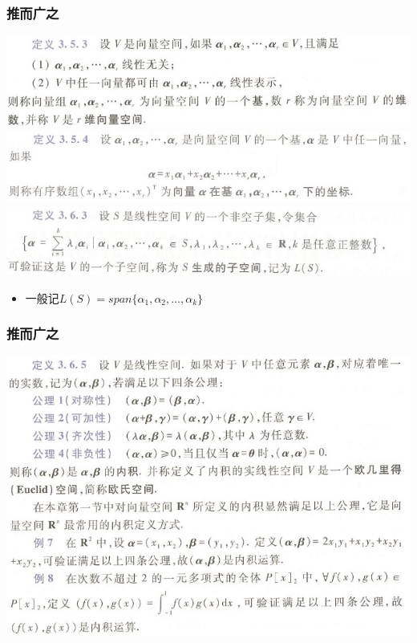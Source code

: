 \documentclass[CJKutf8,xcolor=pdftex,dvipsnames,table]{beamer}
\begin{document}
\begin{CJK*}{UTF8}{song}
  \begin{frame}
    \frametitle{推而广之}
    \begin{center}
      \includegraphics[scale=.5]{cqu-la-def-3-5-3}
      \includegraphics[scale=.5]{cqu-la-def-3-5-4}
      \includegraphics[scale=.5]{cqu-la-def-3-6-3}
    \end{center}
    \begin{itemize}
    \item 一般记$L(S)=span\{\alpha_1, \alpha_2, \hdots, \alpha_k\}$
    \end{itemize}
  \end{frame}   

  \begin{frame}
    \frametitle{推而广之}
    \begin{center}
      \includegraphics[scale=.5]{cqu-la-def-3-6-5}


\end{center}
\end{frame}
\end{CJK*}
\end{document}
